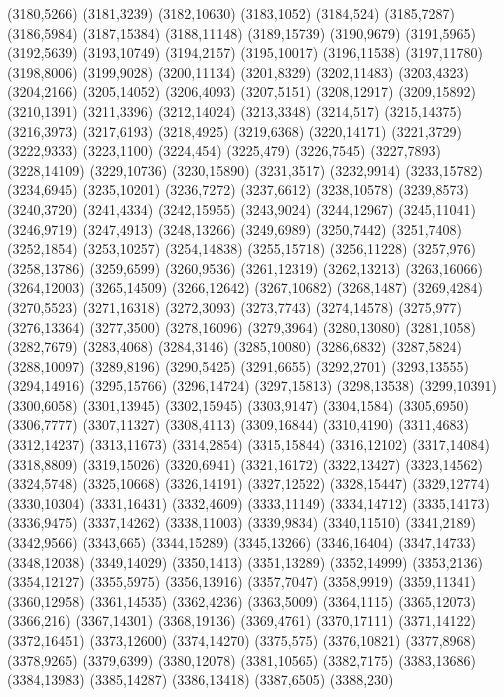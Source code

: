 (3180,5266)
(3181,3239)
(3182,10630)
(3183,1052)
(3184,524)
(3185,7287)
(3186,5984)
(3187,15384)
(3188,11148)
(3189,15739)
(3190,9679)
(3191,5965)
(3192,5639)
(3193,10749)
(3194,2157)
(3195,10017)
(3196,11538)
(3197,11780)
(3198,8006)
(3199,9028)
(3200,11134)
(3201,8329)
(3202,11483)
(3203,4323)
(3204,2166)
(3205,14052)
(3206,4093)
(3207,5151)
(3208,12917)
(3209,15892)
(3210,1391)
(3211,3396)
(3212,14024)
(3213,3348)
(3214,517)
(3215,14375)
(3216,3973)
(3217,6193)
(3218,4925)
(3219,6368)
(3220,14171)
(3221,3729)
(3222,9333)
(3223,1100)
(3224,454)
(3225,479)
(3226,7545)
(3227,7893)
(3228,14109)
(3229,10736)
(3230,15890)
(3231,3517)
(3232,9914)
(3233,15782)
(3234,6945)
(3235,10201)
(3236,7272)
(3237,6612)
(3238,10578)
(3239,8573)
(3240,3720)
(3241,4334)
(3242,15955)
(3243,9024)
(3244,12967)
(3245,11041)
(3246,9719)
(3247,4913)
(3248,13266)
(3249,6989)
(3250,7442)
(3251,7408)
(3252,1854)
(3253,10257)
(3254,14838)
(3255,15718)
(3256,11228)
(3257,976)
(3258,13786)
(3259,6599)
(3260,9536)
(3261,12319)
(3262,13213)
(3263,16066)
(3264,12003)
(3265,14509)
(3266,12642)
(3267,10682)
(3268,1487)
(3269,4284)
(3270,5523)
(3271,16318)
(3272,3093)
(3273,7743)
(3274,14578)
(3275,977)
(3276,13364)
(3277,3500)
(3278,16096)
(3279,3964)
(3280,13080)
(3281,1058)
(3282,7679)
(3283,4068)
(3284,3146)
(3285,10080)
(3286,6832)
(3287,5824)
(3288,10097)
(3289,8196)
(3290,5425)
(3291,6655)
(3292,2701)
(3293,13555)
(3294,14916)
(3295,15766)
(3296,14724)
(3297,15813)
(3298,13538)
(3299,10391)
(3300,6058)
(3301,13945)
(3302,15945)
(3303,9147)
(3304,1584)
(3305,6950)
(3306,7777)
(3307,11327)
(3308,4113)
(3309,16844)
(3310,4190)
(3311,4683)
(3312,14237)
(3313,11673)
(3314,2854)
(3315,15844)
(3316,12102)
(3317,14084)
(3318,8809)
(3319,15026)
(3320,6941)
(3321,16172)
(3322,13427)
(3323,14562)
(3324,5748)
(3325,10668)
(3326,14191)
(3327,12522)
(3328,15447)
(3329,12774)
(3330,10304)
(3331,16431)
(3332,4609)
(3333,11149)
(3334,14712)
(3335,14173)
(3336,9475)
(3337,14262)
(3338,11003)
(3339,9834)
(3340,11510)
(3341,2189)
(3342,9566)
(3343,665)
(3344,15289)
(3345,13266)
(3346,16404)
(3347,14733)
(3348,12038)
(3349,14029)
(3350,1413)
(3351,13289)
(3352,14999)
(3353,2136)
(3354,12127)
(3355,5975)
(3356,13916)
(3357,7047)
(3358,9919)
(3359,11341)
(3360,12958)
(3361,14535)
(3362,4236)
(3363,5009)
(3364,1115)
(3365,12073)
(3366,216)
(3367,14301)
(3368,19136)
(3369,4761)
(3370,17111)
(3371,14122)
(3372,16451)
(3373,12600)
(3374,14270)
(3375,575)
(3376,10821)
(3377,8968)
(3378,9265)
(3379,6399)
(3380,12078)
(3381,10565)
(3382,7175)
(3383,13686)
(3384,13983)
(3385,14287)
(3386,13418)
(3387,6505)
(3388,230)
